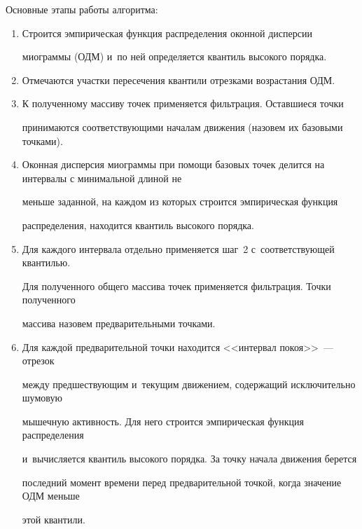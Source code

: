 Основные этапы работы алгоритма:

\begin{enumerate}[1.]

\item  Строится эмпирическая функция распределения оконной дисперсии

миограммы (ОДМ) и~по ней определяется квантиль высокого порядка.



\item  Отмечаются участки пересечения квантили отрезками возрастания ОДМ.



\item  К полученному массиву точек применяется фильтрация. Оставшиеся точки 

принимаются соответствующими началам движения (назовем их базовыми точками).



\item  Оконная дисперсия миограммы при помощи базовых точек делится на интервалы с минимальной длиной не 

меньше заданной, на каждом из которых строится эмпирическая функция 

распределения, находится квантиль высокого порядка.



\item  Для каждого интервала отдельно применяется шаг~2 с~соответствующей квантилью. 

Для полученного общего массива точек применяется фильтрация. Точки полученного 

массива назовем предварительными точками.



\item  Для каждой предварительной точки находится <<интервал покоя>>~--- отрезок 

между предшествующим и~текущим движением, содержащий исключительно шумовую 

мышечную активность. Для него строится эмпирическая функция распределения 

и~вычисляется квантиль высокого порядка. За точку начала движения берется 

последний момент времени перед предварительной точкой, когда значение ОДМ меньше 

этой квантили.

\end{enumerate}







